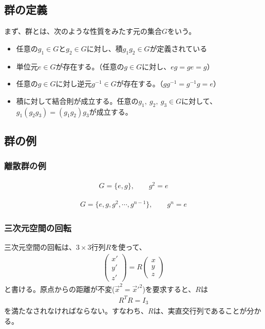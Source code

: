 \documentclass[10pt,a4paper]{jarticle}
\begin{document}
\subsection{群の定義}
まず、群とは、次のような性質をみたす元の集合$G$をいう。
\begin{itemize}
\item 任意の$g_1 \in G$と$g_2 \in G$に対し、積$g_1 g_2 \in G$が定義されている
\item 単位元$e \in G$が存在する。（任意の$g\in G$に対し、$eg=ge=g$）
\item 任意の$g\in G$に対し逆元$g^{-1} \in G$が存在する。（$g g^{-1} = g^{-1} g = e$）
\item 積に対して結合則が成立する。任意の$g_1,~g_2,~g_3\in G$に対して、$g_1 (g_2 g_3) = (g_1 g_2) g_3$が成立する。
\end{itemize}

\subsection{群の例}
\subsubsection{離散群の例}
\begin{align}
G = \{e,g\}, \qquad g^2 = e
\end{align}


\begin{align}
G = \{e,g, g^2, \cdots, g^{n-1}\}, \qquad g^n = e
\end{align}



\subsubsection{三次元空間の回転}
三次元空間の回転は、$3\times 3$行列$R$を使って、
\begin{align}
\left(\begin{array}{c}
x' \\
y' \\
z'
\end{array}\right)
=
R
\left(\begin{array}{c}
x \\
y \\
z
\end{array}\right)
\end{align}
と書ける。原点からの距離が不変($\vec x^2 = \vec x'^2$)を要求すると、$R$は
\begin{align}
R^T R = I_3
\end{align}
を満たなされなければならない。すなわち、$R$は、実直交行列であることが分かる。
\end{document}

